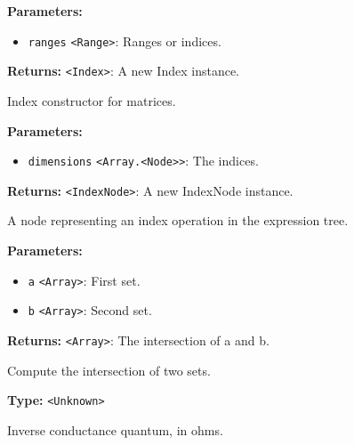 \documentclass[12pt,a4paper]{article}
\begin{document}
\noindent \textbf{Parameters:}
\begin{itemize}
  \item \texttt{ranges} \texttt{<Range>}: Ranges or indices.
\end{itemize}

\noindent \textbf{Returns:} \texttt{<Index>}: A new Index instance.

\noindent Index constructor for matrices.

\vspace{5mm}
\noindent {}


\noindent \textbf{Parameters:}
\begin{itemize}
  \item \texttt{dimensions} \texttt{<Array.<Node>>}: The indices.
\end{itemize}

\noindent \textbf{Returns:} \texttt{<IndexNode>}: A new IndexNode instance.

\noindent A node representing an index operation in the expression tree.

\vspace{5mm}
\noindent {}


\noindent \textbf{Parameters:}
\begin{itemize}
  \item \texttt{a} \texttt{<Array>}: First set.
  \item \texttt{b} \texttt{<Array>}: Second set.
\end{itemize}

\noindent \textbf{Returns:} \texttt{<Array>}: The intersection of a and b.

\noindent Compute the intersection of two sets.

\vspace{5mm}
\noindent {}\vspace{4mm}


\noindent \textbf{Type:} \texttt{<Unknown>}

\noindent Inverse conductance quantum, in ohms.

\vspace{5mm}
\noindent {}
\end{document}
